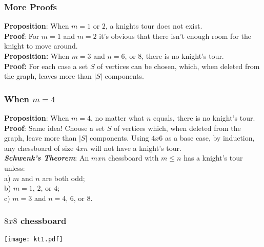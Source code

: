 \documentclass{beamer}
\begin{document}
\begin{frame}
\frametitle{More Proofs}
\textbf{Proposition}:  When $m = 1$ or $2$, a knights tour does not exist. \\
\textbf{Proof}:  For $m = 1$ and $m = 2$ it's obvious that there isn't enough room for the knight to move around.\\
\vspace{3mm}
\textbf{Proposition:}  When $m = 3$ and $n = 6$, or $8$, there is no knight's tour. \\
\textbf{Proof:}  For each case a set $S$ of vertices can be chosen, which, when deleted from the graph, leaves more than $|S|$ components.
\end{frame}


\begin{frame}
\frametitle{When $m = 4$}
\textbf{Proposition}:  When $m = 4$, no matter what $n$ equals, there is no knight's tour. \\
\textbf{Proof}:  Same idea!  Choose a set $S$ of vertices which, when deleted from the graph, leave more than $|S|$ components.  Using $4 x 6$ as a base case, by induction, any chessboard of size $4 x n$ will not have a knight's tour.   \\
\vspace{3mm}
\textbf{\textit{Schwenk's Theorem}}: An $m x n$ chessboard with $m \leq n$ has a knight's tour unless: \\
\hspace{2mm} a) $m$ and $n$ are both odd; \\
\hspace{2mm} b) $m = 1$, $2$, or $4$; \\
\hspace{2mm} c) $m = 3$ and $n = 4$, $6$, or $8$. \\
\end{frame}


\begin{frame}
\frametitle{$8x8$ chessboard}
\vspace{-15mm}
\hspace{1.5cm}
\texttt{[image: kt1.pdf]}
\end{frame}
\end{document}
